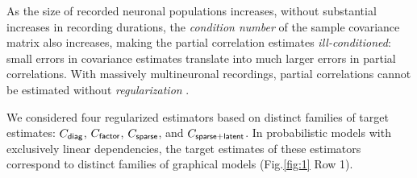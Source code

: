 \documentclass[10pt]{article}
\newcommand{\figref}[2]{Fig.\;\ref{fig:#1}\,#2}
\begin{document}
As the size of recorded neuronal populations increases, without substantial increases in recording durations, the \emph{condition number} of the sample covariance matrix also increases, making the partial correlation estimates \emph{ill-conditioned}: small errors in covariance estimates translate into much larger errors in partial correlations. With massively multineuronal recordings, partial correlations cannot be estimated without \emph{regularization} \cite{Ledoit:2004,Schafer:2005}.

We considered four regularized estimators based on distinct families of target estimates: $C_{\sf diag}$, $C_{\sf factor}$, $C_{\sf sparse}$, and $C_{\sf sparse+latent}$. In probabilistic models with exclusively linear dependencies, the target estimates of these estimators correspond to distinct families of graphical models (\figref{1}{\,Row 1}).  
\end{document}
